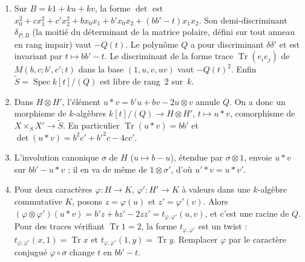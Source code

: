 \begin{enonce}\leavevmode
\begin{enumerate}
\item Sur $B = k1 + ku + kv$, la forme $\det$ est $x_0^2 + cx_1^2 + c'x_2^2 + bx_0x_1 + b'x_0x_2 + (bb' - t)x_1x_2$. Son demi-discriminant $\delta_{P,B}$ (la moitié du déterminant de la matrice polaire, défini sur tout anneau en rang impair) vaut $-Q(t)$. Le polynôme $Q$ a pour discriminant $\delta\delta'$ et est invariant par $t \mapsto bb' - t$. Le discriminant de la forme trace $\operatorname{Tr}(e_ie_j)$ de $M(b, c; b', c'; t)$ dans la base $(1, u, v, uv)$ vaut $-Q(t)^2$. Enfin $\widetilde S = \operatorname{Spec} k[t]/(Q)$ est libre de rang~$2$ sur~$k$.
\item Dans $H \otimes H'$, l'élément $u * v = b'u + bv - 2u \otimes v$ annule $Q$. On a donc un morphisme de $k$-algèbres $k[t]/(Q) \to H \otimes H'$, $t \mapsto u * v$, comorphisme de $X \times_S X' \to \widetilde S$. En particulier $\operatorname{Tr}(u * v) = bb'$ et $\det(u * v) = b^2c' + b'^2c - 4cc'$.
\item L'involution canonique $\sigma$ de $H$ ($u \mapsto b - u$), étendue par $\sigma \otimes 1$, envoie $u * v$ sur $bb' - u * v$ ; il en va de même de $1 \otimes \sigma'$, d'où $u' * v = u * v'$.
\item Pour deux caractères $\varphi : H \to K$, $\varphi' : H' \to K$ à valeurs dans une $k$-algèbre commutative $K$, posons $z = \varphi(u)$ et $z' = \varphi'(v)$. Alors $(\varphi \otimes \varphi')(u * v) = b'z + bz' - 2zz' = t_{\varphi,\varphi'}(u, v)$, et c'est une racine de $Q$. Pour des traces vérifiant $\operatorname{Tr}1 = 2$, la forme $t_{\varphi,\varphi'}$ est un twist : $t_{\varphi,\varphi'}(x, 1) = \operatorname{Tr}x$ et $t_{\varphi,\varphi'}(1, y) = \operatorname{Tr}y$. Remplacer $\varphi$ par le caractère conjugué $\varphi \circ \sigma$ change $t$ en $bb' - t$.
\end{enumerate}
\end{enonce}

